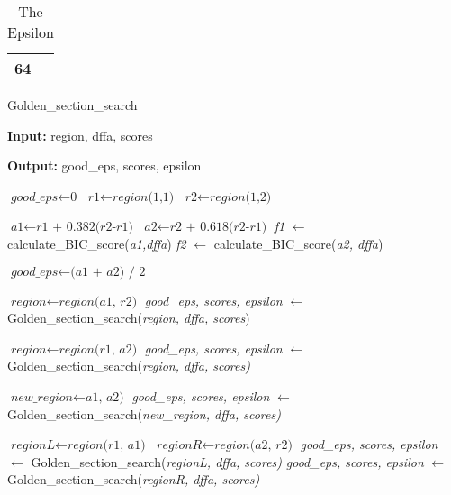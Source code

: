\documentclass[
a4paper,
12pt
]{scrartcl}
\begin{document}
\begin{table}[ht!]
\centering
\begin{tabular}{|l|}
\hline
64 \\ \hline
\end{tabular}
\caption{The Epsilon}
\label{table:goodepsilon}
\end{table}

\begin{algorithm}[H]
\caption{Golden\_section\_search}\label{alg:goldensection}
\begin{algorithmic}[1]
\item \textbf{Input:} region, dffa, scores
\item \textbf{Output:} good\_eps, scores, epsilon

\State $\textit{good\_eps} \gets \textit{0}$
\State $\textit{r1} \gets \textit{region(1,1)}$
\State $\textit{r2} \gets \textit{region(1,2)}$


       \State $\textit{a1} \gets \textit{r1 + 0.382(r2-r1)}$ \label{golden:calcratio}
       \State $\textit{a2} \gets \textit{r2 + 0.618(r2-r1)}$ \label{golden:calcratio2}
       \State \textit{f1} $\gets$ calculate\_BIC\_score(\textit{a1,dffa}) \label{golden:bicscore}
       \State \textit{f2} $\gets$ calculate\_BIC\_score(\textit{a2, dffa}) \label{golden:bicscore2}

          \label{golden:condition}
       \State $\textit{good\_eps} \gets \textit{(a1 + a2) / 2}$   \label{golden:average}
        \State \Return
       \EndIf

        \State $\textit{region} \gets \textit{region(a1, r2)}$
        \State \textit{good\_eps, scores, epsilon} $\gets$ Golden\_section\_search(\textit{region, dffa, scores})
       \State \Return

        \State $\textit{region} \gets \textit{region(r1, a2)}$
        \State \textit{good\_eps, scores, epsilon} $\gets$ Golden\_section\_search(\textit{region, dffa, scores)}
        \State \Return

      \Else
          \label{golden:limit}
        \State \Return
        \EndIf

          \label{golden:maxscores}
        \State $\textit{new\_region} \gets \textit{a1, a2)}$
        \State \textit{good\_eps, scores, epsilon} $\gets$ Golden\_section\_search(\textit{new\_region, dffa, scores)}
        \State \Return

        \Else
          \State $\textit{regionL} \gets \textit{region(r1, a1)}$
          \State $\textit{regionR} \gets \textit{region(a2, r2)}$
        \State \textit{good\_eps, scores, epsilon} $\gets$ Golden\_section\_search(\textit{regionL, dffa, scores)} \label{golden:leftregion}
         \State \textit{good\_eps, scores, epsilon} $\gets$ Golden\_section\_search(\textit{regionR, dffa, scores)} \label{golden:rightregion}
        \State \Return
        \EndIf
       \EndIf

  \EndWhile
\end{algorithmic}
\end{algorithm}
\end{document}
